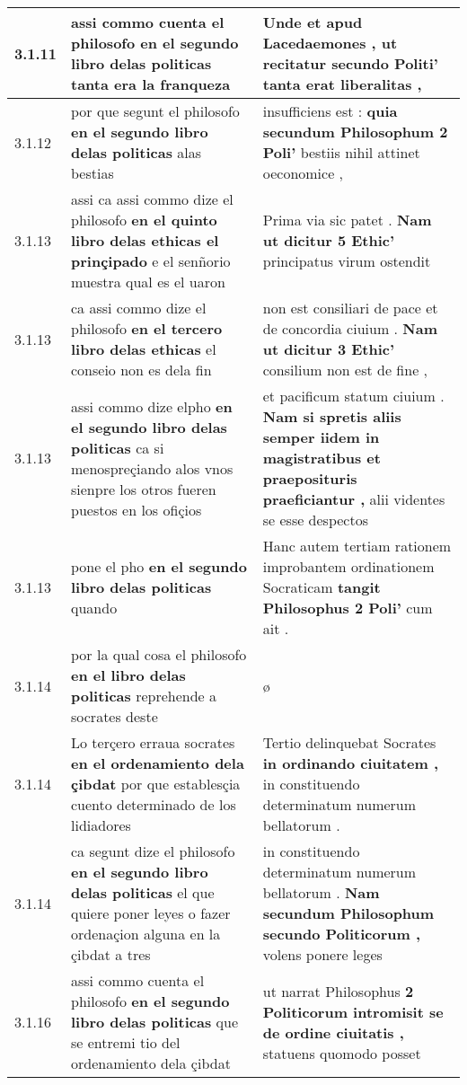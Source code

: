 \begin{tabular}{|p{1cm}|p{6.5cm}|p{6.5cm}|}
3.1.11 & assi commo cuenta el philosofo \textbf{ en el segundo libro delas politicas } tanta era la franqueza & Unde et apud Lacedaemones , \textbf{ ut recitatur secundo Politi’ } tanta erat liberalitas , \\\hline
3.1.12 & por que segunt el philosofo \textbf{ en el segundo libro delas politicas } alas bestias & insufficiens est : \textbf{ quia secundum Philosophum 2 Poli’ } bestiis nihil attinet oeconomice , \\\hline
3.1.13 & assi ca assi commo dize el philosofo \textbf{ en el quinto libro delas ethicas el prinçipado } e el senñorio muestra qual es el uaron & Prima via sic patet . \textbf{ Nam ut dicitur 5 Ethic’ } principatus virum ostendit \\\hline
3.1.13 & ca assi commo dize el philosofo \textbf{ en el tercero libro delas ethicas } el conseio non es dela fin & non est consiliari de pace et de concordia ciuium . \textbf{ Nam ut dicitur 3 Ethic’ } consilium non est de fine , \\\hline
3.1.13 & assi commo dize elpho \textbf{ en el segundo libro delas politicas } ca si menospreçiando alos vnos sienpre los otros fueren puestos en los ofiçios & et pacificum statum ciuium . \textbf{ Nam si spretis aliis semper iidem in magistratibus et praeposituris praeficiantur , } alii videntes se esse despectos \\\hline
3.1.13 & pone el pho \textbf{ en el segundo libro delas politicas } quando & Hanc autem tertiam rationem improbantem ordinationem Socraticam \textbf{ tangit Philosophus 2 Poli’ } cum ait . \\\hline
3.1.14 & por la qual cosa el philosofo \textbf{ en el libro delas politicas } reprehende a socrates deste & ø \\\hline
3.1.14 & Lo terçero erraua socrates \textbf{ en el ordenamiento dela çibdat } por que establesçia cuento determinado de los lidiadores & Tertio delinquebat Socrates \textbf{ in ordinando ciuitatem , } in constituendo determinatum numerum bellatorum . \\\hline
3.1.14 & ca segunt dize el philosofo \textbf{ en el segundo libro delas politicas } el que quiere poner leyes o fazer ordenaçion alguna en la çibdat a tres & in constituendo determinatum numerum bellatorum . \textbf{ Nam secundum Philosophum secundo Politicorum , } volens ponere leges \\\hline
3.1.16 & assi commo cuenta el philosofo \textbf{ en el segundo libro delas politicas } que se entremi tio del ordenamiento dela çibdat & ut narrat Philosophus \textbf{ 2 Politicorum intromisit se de ordine ciuitatis , } statuens quomodo posset \\\hline

\end{tabular}
